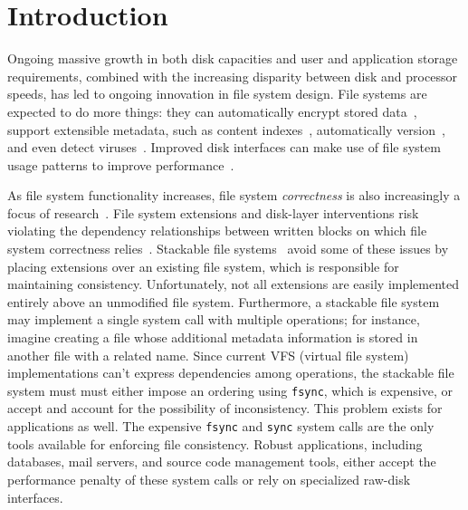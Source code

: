 
\section {Introduction}
\label{sec:intro}


Ongoing massive growth in both disk capacities and user and application
 storage requirements, combined with the increasing
 disparity between disk and processor speeds, has led to ongoing
 innovation in file system design.
%
File systems are expected to do more things: they can automatically encrypt
 stored data~\cite{wright03ncryptfs}, support extensible metadata, such as
 content indexes~\cite{gifford91semantic}, automatically
 version~\cite{soules03metadata,fast04versionfs,quinlan02venti,cornell04wayback},
 and even detect viruses~\cite{miretskiy04avfs}.
%
Improved disk interfaces can make use of file system usage patterns to
 improve
 performance~\cite{sivathanu03semantically-smart,sivathanu05database-aware}.


As file system functionality increases, file system \emph{correctness} is
 also increasingly a focus of
 research~\cite{sivathanuetal05-logic,denehyetal05-journal-guided}.
%
File system extensions and disk-layer interventions risk violating
 the dependency relationships between written blocks on which file system
 correctness relies~\cite{ganger00soft}.
%
Stackable file
 systems~\cite{zadok00fist,zadok99extending,heidemann94filesystem,rosenthal90evolving}
 avoid some of these issues by placing extensions over an existing
 file system, which is responsible for maintaining consistency.
%
Unfortunately, not all extensions are easily implemented entirely above an
 unmodified file system.
%
Furthermore, a stackable file system may implement a single system call
 with multiple operations; for instance, imagine creating a file whose
 additional metadata information is stored in another file with a related
 name.
%
Since current VFS (virtual file system) implementations can't
 express dependencies among operations, the stackable
 file system must must either impose an ordering using \texttt{fsync},
 which is expensive, or accept and account for the possibility of
 inconsistency.
%
This problem exists for applications as well.
%
The expensive \texttt{fsync} and \texttt{sync} system calls are the only
 tools available for enforcing file consistency.
%
Robust applications, including databases, mail servers, and source code
 management tools, either accept the performance penalty of these system
 calls or rely on specialized raw-disk interfaces.



